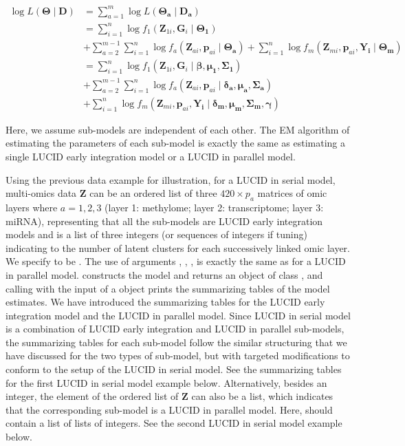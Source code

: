 \begin{equation}
    \begin{aligned}
         \log L(\bm{\Theta}\mid \boldsymbol{D}) & = \sum_{a = 1}^m \log L(\bm{\Theta_a}\mid \bm{D_a}) \\ &
         = \sum_{i = 1}^n \log f_1(\bm{Z}_{1i}, \bm{G}_i \mid \bm{\Theta_1}) \\ &
         + \sum_{a = 2}^{m-1} \sum_{i = 1}^n \log f_a(\bm{Z}_{ai}, \bm{p}_{ai} \mid \bm{\Theta_a}) + \sum_{i = 1}^n \log f_m(\bm{Z}_{mi}, \bm{p}_{ai}, \bm{Y_i} \mid \bm{\Theta_m}) \\ &
         = \sum_{i = 1}^n \log f_1(\bm{Z}_{1i}, \bm{G}_i \mid \bm{\beta}, \bm{\mu_1}, \bm{\Sigma_1}) \\ &
         + \sum_{a = 2}^{m-1} \sum_{i = 1}^n \log f_a(\bm{Z}_{ai}, \bm{p}_{ai} \mid \bm{\delta_a}, \bm{\mu_a}, \bm{\Sigma_a}) \\ &
         + \sum_{i = 1}^n \log f_m(\bm{Z}_{mi}, \bm{p}_{ai}, \bm{Y_i} \mid \bm{\delta_m}, \bm{\mu_m}, \bm{\Sigma_m}, \bm{\gamma})
    \end{aligned}
    \label{eq_27}
\end{equation}

Here, we assume sub-models are independent of each other. The EM algorithm of estimating the parameters of each sub-model is exactly the same as estimating a single LUCID early integration model or a LUCID in parallel model.

Using the previous data example for illustration, for a LUCID in serial model, multi-omics data $\bm Z$ can be an ordered list of three $420 \times p_a$ matrices of omic layers where $a = 1, 2, 3$ (layer 1: methylome; layer 2: transcriptome; layer 3: miRNA), representing that all the sub-models are LUCID early integration models and  is a list of three integers (or sequences of integers if tuning) indicating to the number of latent clusters for each successively linked omic layer. We specify  to be . The use of arguments , , ,  is exactly the same as for a LUCID in parallel model.  constructs the model and returns an object of class , and calling  with the input of a  object prints the summarizing tables of the model estimates. We have introduced the summarizing tables for the LUCID early integration model and the LUCID in parallel model. Since LUCID in serial model is a combination of LUCID early integration and LUCID in parallel sub-models, the summarizing tables for each sub-model follow the similar structuring that we have discussed for the two types of sub-model, but with targeted modifications to conform to the setup of the LUCID in serial model. See the summarizing tables for the first LUCID in serial model example below. Alternatively, besides an integer, the element of the ordered list of $\bm Z$ can also be a list, which indicates that the corresponding sub-model is a LUCID in parallel model. Here,  should contain a list of lists of integers. See the second LUCID in serial model example below. 

